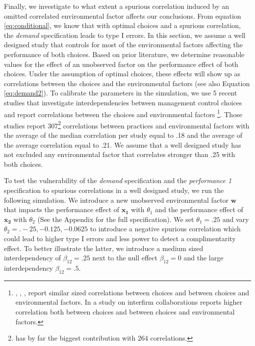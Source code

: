 \documentclass[12pt]{article}
\begin{document}
Finally, we investigate to what extent a spurious correlation induced by
an omitted correlated environmental factor affects our conclusions. From
equation \eqref{eq:conditional}, we know that with optimal choices and a
spurious correlation, the \emph{demand} specification leads to type I
errors. In this section, we assume a well designed study that controls
for most of the environmental factors affecting the performance of both
choices. Based on prior literature, we determine reasonable values for
the effect of an unobserved factor on the performance effect of both
choices. Under the assumption of optimal choices, these effects will
show up as correlations between the choices and the environmental
factors (see also Equation \eqref{eq:demand2}). To calibrate the
parameters in the simulation, we use 5 recent studies that investigate
interdependencies between management control choices and report
correlations between the choices and environmental factors
\citep{Dekker2016, Grabner2016, Bedford2015, Heinicke2016, Abernethy2015a}\footnote{\citet{Grabner2016},
  \citet{Bedford2015}, \citet{Heinicke2016}, \citet{Abernethy2015a}
  report similar sized correlations between choices and between choices
  and environmental factors. In a study on interfirm collaborations
  \citet{Dekker2016} reports higher correlation both between choices and
  between choices and environmental factors.}. Those studies report
307\footnote{\citet{Bedford2015} has by far the biggest contribution
  with 264 correlations.} correlations between practices and
environmental factors with the average of the median correlation per
study equal to .18 and the average of the average correlation equal to
.21. We assume that a well designed study has not excluded any
environmental factor that correlates stronger than .25 with both
choices.

To test the vulnerability of the \emph{demand} specification and the
\emph{performance 1} specification to spurious correlations in a well
designed study, we run the following simulation. We introduce a new
unobserved environmental factor \(\mathbf{w}\) that impacts the
performance effect of \(\mathbf{x_1}\) with \(\theta_1\) and the
performance effect of \(\mathbf{x_2}\) with \(\theta_2\) (See the
Appendix for the full specification). We set \(\theta_1 = .25\) and vary
\(\theta_2 = .-25, -0.125, -0.0625\) to introduce a negative spurious
correlation which could lead to higher type I errors and less power to
detect a complimentarity effect. To better illustrate the latter, we
introduce a medium sized interdependency of \(\beta_{12} = .25\) next to
the null effect \(\beta_{12} = 0\) and the large interdependency
\(\beta_{12} = .5\).
\end{document}
